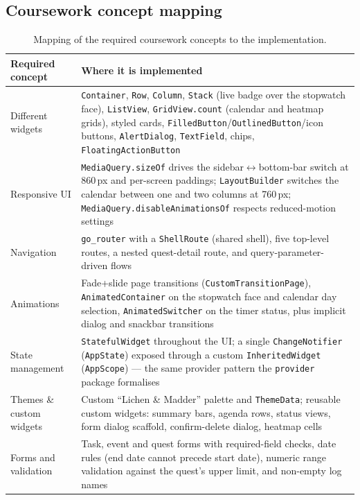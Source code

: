 \documentclass[12pt,a4paper]{article}
\begin{document}
\subsection{Coursework concept mapping}
\begin{table}[H]
\centering
\small
\begin{tabularx}{\textwidth}{lX}
\toprule
\textbf{Required concept} & \textbf{Where it is implemented} \\
\midrule
Different widgets & \texttt{Container}, \texttt{Row}, \texttt{Column},
\texttt{Stack} (live badge over the stopwatch face), \texttt{ListView},
\texttt{GridView.count} (calendar and heatmap grids), styled cards,
\texttt{FilledButton}/\texttt{OutlinedButton}/icon buttons,
\texttt{AlertDialog}, \texttt{TextField}, chips, \texttt{FloatingActionButton} \\
\midrule
Responsive UI & \texttt{MediaQuery.sizeOf} drives the sidebar$\leftrightarrow$bottom-bar switch at 860\,px and per-screen paddings; \texttt{LayoutBuilder} switches the calendar between one and two columns at 760\,px; \texttt{MediaQuery.disableAnimationsOf} respects reduced-motion settings \\
\midrule
Navigation & \texttt{go\_router} with a \texttt{ShellRoute} (shared shell), five top-level routes, a nested quest-detail route, and query-parameter-driven flows \\
\midrule
Animations & Fade+slide page transitions (\texttt{CustomTransitionPage}), \texttt{AnimatedContainer} on the stopwatch face and calendar day selection, \texttt{AnimatedSwitcher} on the timer status, plus implicit dialog and snackbar transitions \\
\midrule
State management & \texttt{StatefulWidget} throughout the UI; a single \texttt{ChangeNotifier} (\texttt{AppState}) exposed through a custom \texttt{InheritedWidget} (\texttt{AppScope}) --- the same provider pattern the \texttt{provider} package formalises \\
\midrule
Themes \& custom widgets & Custom ``Lichen \& Madder'' palette and \texttt{ThemeData}; reusable custom widgets: summary bars, agenda rows, status views, form dialog scaffold, confirm-delete dialog, heatmap cells \\
\midrule
Forms and validation & Task, event and quest forms with required-field checks, date rules (end date cannot precede start date), numeric range validation against the quest's upper limit, and non-empty log names \\
\bottomrule
\end{tabularx}
\caption{Mapping of the required coursework concepts to the implementation.}
\label{tab:concepts}
\end{table}
\end{document}

